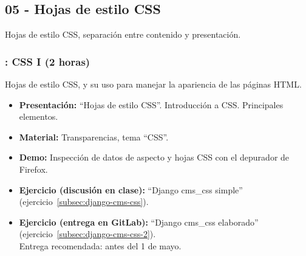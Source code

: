 \documentclass[a4paper,12pt]{article}
\begin{document}
%
%
%
%
\subsection{05 - Hojas de estilo CSS}

Hojas de estilo CSS, separación entre contenido y presentación.

\subsubsection{\juevesL: CSS I (2 horas)}
\label{cal:juevesL}

Hojas de estilo CSS, y su uso para manejar la apariencia de las páginas HTML.

\begin{itemize}
\item \textbf{Presentación:} ``Hojas de estilo CSS''. Introducción a CSS. Principales elementos.
 \item \textbf{Material:} Transparencias, tema ``CSS''.
\item \textbf{Demo:} Inspección de datos de aspecto y hojas CSS con el depurador de Firefox.
\item \textbf{Ejercicio (discusión en clase):} ``Django cms\_css simple'' (ejercicio~\ref{subsec:django-cms-css}).
\item \textbf{Ejercicio (entrega en GitLab):} ``Django cms\_css elaborado'' (ejercicio~\ref{subsec:django-cms-css-2}). \\
  Entrega recomendada: antes del 1 de mayo.
\end{itemize}
\end{document}
